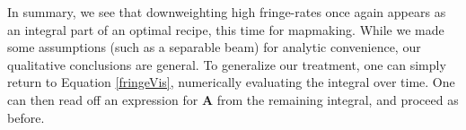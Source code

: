 \documentclass[twocolumn,apj,numberedappendix]{emulateapj}
\newcommand{\rhat}{\hat{\mathbf{r}}}
\begin{document}
In summary, we see that downweighting high fringe-rates once again appears as an integral part of an optimal
recipe, this time for mapmaking. While we made some assumptions (such as a separable beam) for analytic
convenience, our qualitative conclusions are general. To generalize our treatment, one can simply return
to Equation \eqref{fringeVis}, numerically evaluating the integral over time. One can then read off an expression
for $\mathbf{A}$ from the remaining integral, and proceed as before.
%
%
\end{document}
